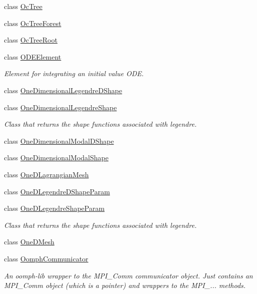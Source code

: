 \begin{DoxyCompactItemize}
class \hyperlink{classoomph_1_1OcTree}{Oc\+Tree}
\item 
class \hyperlink{classoomph_1_1OcTreeForest}{Oc\+Tree\+Forest}
\item 
class \hyperlink{classoomph_1_1OcTreeRoot}{Oc\+Tree\+Root}
\item 
class \hyperlink{classoomph_1_1ODEElement}{O\+D\+E\+Element}
\begin{DoxyCompactList}\small\item\em Element for integrating an initial value O\+DE. \end{DoxyCompactList}\item 
class \hyperlink{classoomph_1_1OneDimensionalLegendreDShape}{One\+Dimensional\+Legendre\+D\+Shape}
\item 
class \hyperlink{classoomph_1_1OneDimensionalLegendreShape}{One\+Dimensional\+Legendre\+Shape}
\begin{DoxyCompactList}\small\item\em Class that returns the shape functions associated with legendre. \end{DoxyCompactList}\item 
class \hyperlink{classoomph_1_1OneDimensionalModalDShape}{One\+Dimensional\+Modal\+D\+Shape}
\item 
class \hyperlink{classoomph_1_1OneDimensionalModalShape}{One\+Dimensional\+Modal\+Shape}
\item 
class \hyperlink{classoomph_1_1OneDLagrangianMesh}{One\+D\+Lagrangian\+Mesh}
\item 
class \hyperlink{classoomph_1_1OneDLegendreDShapeParam}{One\+D\+Legendre\+D\+Shape\+Param}
\item 
class \hyperlink{classoomph_1_1OneDLegendreShapeParam}{One\+D\+Legendre\+Shape\+Param}
\begin{DoxyCompactList}\small\item\em Class that returns the shape functions associated with legendre. \end{DoxyCompactList}\item 
class \hyperlink{classoomph_1_1OneDMesh}{One\+D\+Mesh}
\item 
class \hyperlink{classoomph_1_1OomphCommunicator}{Oomph\+Communicator}
\begin{DoxyCompactList}\small\item\em An oomph-\/lib wrapper to the M\+P\+I\+\_\+\+Comm communicator object. Just contains an M\+P\+I\+\_\+\+Comm object (which is a pointer) and wrappers to the M\+P\+I\+\_\+... methods. \end{DoxyCompactList}\item 

\end{DoxyCompactItemize}
